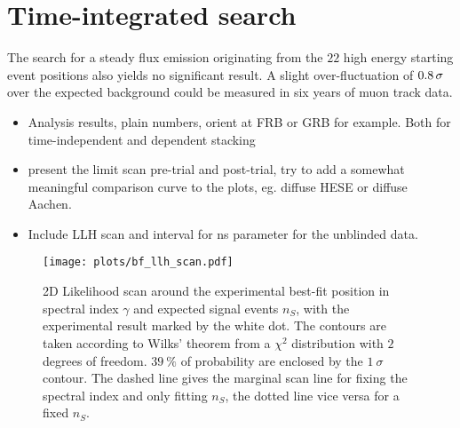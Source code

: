 \section*{Time-integrated search}
The search for a steady flux emission originating from the $\num{22}$ high energy starting event positions also yields no significant result.
A slight over-fluctuation of $\num{0.8}\,\sigma$ over the expected background could be measured in six years of muon track data.


\begin{itemize}
  \item Analysis results, plain numbers, orient at FRB or GRB for example.
  Both for time-independent and dependent stacking
  \item present the limit scan pre-trial and post-trial, try to add a somewhat meaningful comparison curve to the plots, eg. diffuse HESE or diffuse Aachen.
  \item Include LLH scan and interval for ns parameter for the unblinded data.
\end{itemize}

\begin{figure}[htbp]
  \centering
  \texttt{[image: plots/bf\_llh\_scan.pdf]}
  \caption[2D LLH scan of $n_S$ and $\gamma$ for the time integrated search.]{
    2D Likelihood scan around the experimental best-fit position in spectral index $\gamma$ and expected signal events $n_S$, with the experimental result marked by the white dot.
    The contours are taken according to Wilks' theorem from a $\chi^2$ distribution with $\num{2}$ degrees of freedom.
    $\SI{39}{\percent}$ of probability are enclosed by the $\SI{1}{\sigma}$ contour.
    The dashed line gives the marginal scan line for fixing the spectral index and only fitting $n_S$, the dotted line vice versa for a fixed $n_S$.}
\end{figure}
